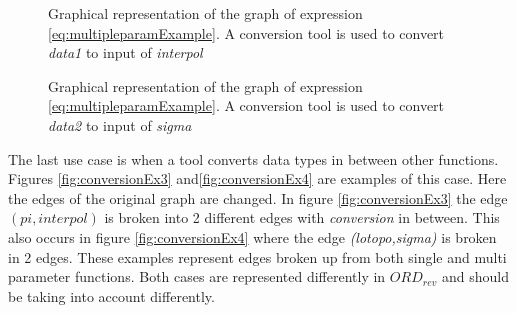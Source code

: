 \documentclass{article}
\begin{document}
 \begin{figure}[H]
    \centering
   \begin{minipage}{.45\textwidth}
   \centering
   
    
    \caption{Graphical representation of the graph of expression \ref{eq:multipleparamExample}. A conversion tool is used to convert \textit{data1} to input of \textit{interpol}}
    \label{fig:conversionEx1}
   \end{minipage}%
   \qquad
      \begin{minipage}{.45\textwidth}
   \centering
    
    \caption{Graphical representation of the graph of expression \ref{eq:multipleparamExample}. A conversion tool is used to convert \textit{data2} to input of \textit{sigma}}
   \label{fig:conversionEx2}
   \end{minipage}
\end{figure}

The last use case is when a tool converts data types in between other functions. Figures \ref{fig:conversionEx3} and\ref{fig:conversionEx4} are examples of this case. Here the edges of the original graph are changed. In figure \ref{fig:conversionEx3} the edge $(pi,interpol)$ is broken into 2 different edges with \textit{conversion} in between. This also occurs in figure \ref{fig:conversionEx4} where the edge \textit{(lotopo,sigma)} is broken in 2 edges. These examples represent edges broken up from both single and multi parameter functions. Both cases are represented differently in $ORD_{rev}$ and should be taking into account differently.
\end{document}
